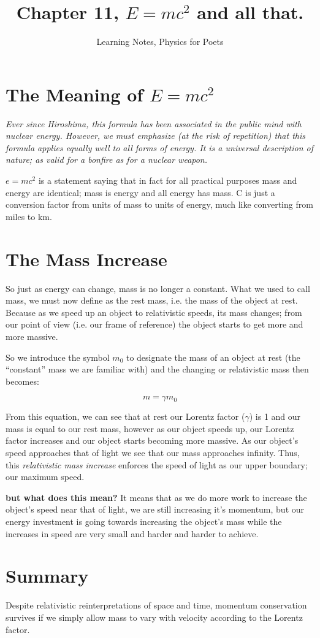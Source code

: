 \documentclass[12pt, letterpaper]{article}
\title{Chapter 11, $E=mc^2$ and all that.}
\author{Learning Notes, Physics for Poets}
\date{}
\begin{document}
    \maketitle

    \section{The Meaning of $E=mc^2$}
    \textit{Ever since Hiroshima, this formula has been associated in the public 
    mind with nuclear energy. However, we must emphasize (at the risk of 
    repetition) that this formula applies equally well to all forms of 
    energy. It is a universal description of nature; as valid for a bonfire 
    as for a nuclear weapon.}   
    
    $e=mc^2$ is a statement saying that in fact for all practical purposes 
    mass and energy are identical; mass is energy and all energy has mass. 
    C is just a conversion factor from units of mass to units of energy, 
    much like converting from miles to km.
    
    \section{The Mass Increase}    
    So just as energy can change, mass is no longer a constant. 
    What we used to call mass, we must now define as the rest mass, i.e. 
    the mass of the object at rest. Because as we speed 
    up an object to relativistic speeds, its mass changes;
    from our point of view (i.e. our frame of reference) the object 
    starts to get more and more massive.

    So we introduce the symbol $m_0$ to designate the mass of an 
    object at rest (the ``constant'' mass we are familiar with) and the 
    changing or relativistic mass then becomes:
    
    $$m=\gamma m_0$$
    
    From this equation, we can see that at rest our Lorentz factor ($\gamma$) 
    is 1 and our mass is equal to our rest mass, however as our object speeds 
    up, our Lorentz factor increases and our object starts becoming more 
    massive. As our object's speed approaches that of light we see that 
    our mass approaches infinity. Thus, this \textit{relativistic mass 
    increase} enforces the speed of light as our upper boundary; our 
    maximum speed.
    
    \medskip
    \textbf{but what does this mean?}
    It means that as we do more work to increase the object's speed near 
    that of light, we are still increasing it's momentum, but our 
    energy investment is going towards increasing the object's mass while 
    the increases in speed are very small and harder and harder to achieve. 
    
    \section{Summary}    
    Despite relativistic reinterpretations of space and time, momentum conservation 
    survives if we simply allow mass to vary with velocity according to 
    the Lorentz factor.
    
\end{document}
